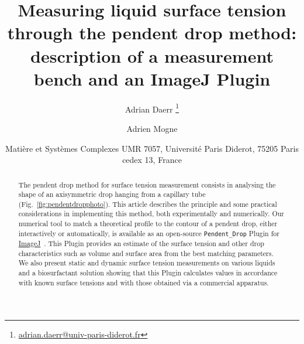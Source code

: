 \documentclass[fleqn]{scrartcl}
\newcommand{\email}[1]{\url{#1}}
\newcommand{\gouttependante}{\texttt{Pendent\_Drop}\xspace}
\begin{document}
\subject{\gouttependante}

\title{Measuring liquid surface tension through the
       pendent drop method: description of a measurement bench and an
       ImageJ Plugin}

\author{Adrian Daerr%
        \footnote{\email{adrian.daerr@univ-paris-diderot.fr}} \and
        Adrien Mogne}

\date{\scriptsize Matière et Systèmes Complexes UMR 7057,
      Université Paris Diderot, 75205 Paris cedex 13, France}

\maketitle

\begin{abstract}
  The pendent drop method for surface tension measurement consists in
  analysing the shape of an axisymmetric drop hanging from a capillary
  tube (Fig.~\ref{fig:pendentdropphoto}). This article describes the
  principle and some practical considerations in implementing this
  method, both experimentally and numerically. Our numerical tool to
  match a theoretical profile to the contour of a pendent drop, either
  interactively or automatically, is available as an open-source
  \gouttependante Plugin for
  \href{http://imagej.nih.gov/ij/}{ImageJ}~\cite{ImageJ}. This Plugin
  provides an estimate of the surface tension and other drop
  characteristics such as volume and surface area from the best
  matching parameters. We also present static and dynamic surface
  tension measurements on various liquids and a biosurfactant solution
  showing that this Plugin calculates values in accordance with known
  surface tensions and with those obtained via a commercial apparatus.
\end{abstract}
\end{document}
